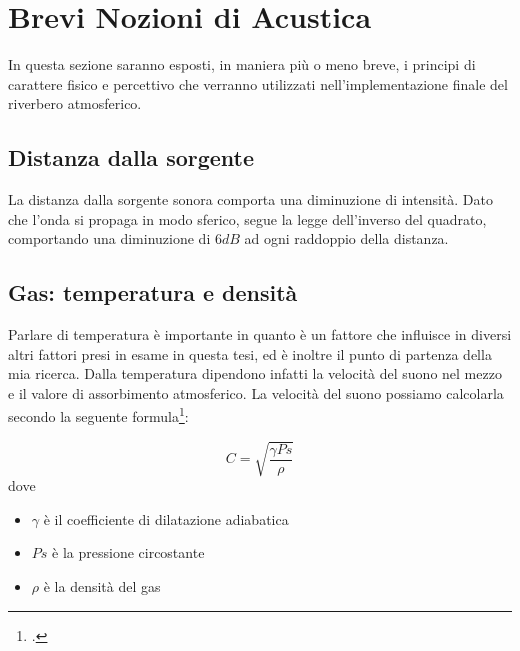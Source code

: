 \section{Brevi Nozioni di Acustica}

In questa sezione saranno esposti, in maniera più o meno breve, i principi di
carattere fisico e percettivo che verranno utilizzati nell'implementazione
finale del riverbero atmosferico.


\subsection{Distanza dalla sorgente}

La distanza dalla sorgente sonora comporta una diminuzione di intensità. Dato
che l’onda si propaga in modo sferico, segue la legge dell’inverso del quadrato,
comportando una diminuzione di $6dB$ ad ogni raddoppio della distanza.

\subsection{Gas: temperatura e densità}

Parlare di temperatura è importante in quanto è un fattore che influisce in
diversi altri fattori presi in esame in questa tesi, ed è inoltre il punto di
partenza della mia ricerca. Dalla temperatura dipendono infatti la velocità del
suono nel mezzo e il valore di assorbimento atmosferico. La velocità del suono
possiamo calcolarla secondo la seguente formula\footcite{gb:book}:

\begin{equation}
C=\sqrt{\frac{\gamma Ps}{\rho}}
\end{equation}
dove

\begin{itemize}
      \item $\gamma$ è il coefficiente di dilatazione adiabatica
      \item $Ps$ è la pressione circostante
      \item $\rho$ è la densità del gas
\end{itemize}

